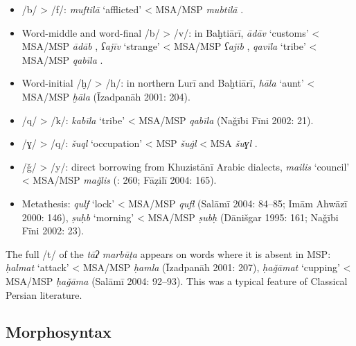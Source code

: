 \documentclass[output=paper]{langsci/langscibook}
\begin{document}
\begin{itemize}
\item
/b/ > /f/: \emph{muftilā} ‘afflicted’ < MSA/MSP \textit{mubtilā} \citep{Borjian2017}.

\item
Word-middle and word-final /b/ > /v/: in Baḫtiārī, \textit{ādāv} ‘customs’ < MSA/MSP \textit{ādāb} \citep[15]{Sarlak2002}, \textit{ʕajīv} ‘strange’ < MSA/MSP \textit{ʕajīb} \citep[25]{Sarlak2002}, \textit{qavīla} ‘tribe’ < MSA/MSP \textit{qabīla} \citep[199]{Sarlak2002}.

\item
Word-initial /ḫ/ > /h/: in northern Lurī and Baḫtiārī, \textit{hāla} ‘aunt’ < MSA/MSP \textit{ḫāla} (Īzadpanāh 2001: 204).

\item
/q/ > /k/: \textit{kabīla} ‘tribe’ < MSA/MSP \textit{qabīla} (Naǧībi Fīni 2002: 21).

\item
/ɣ/ > /q/: \textit{šuql} ‘occupation’ < MSP \textit{šu\.gl} < MSA \textit{šuɣl} \citep{Stilo2001}.

\item
/ǧ/ > /y/: direct borrowing from Khuzistānī Arabic dialects, \textit{mailis} ‘council’ < MSA/MSP \textit{maǧlis} (\citealt{Sarlak2002}: 260; Fāẓilī 2004: 165).

\item
Metathesis: \textit{qulf} ‘lock’ < MSA/MSP \textit{qufl} (Salāmī 2004: 84–85; Imām Ahwāzī 2000: 146), \textit{ṣuḥb} ‘morning’ < MSA/MSP \textit{ṣubḥ} (Dānišgar 1995: 161; Naǧībi Fīni 2002: 23).
\end{itemize}

The full /t/ of the \textit{tāʔ} \textit{marbūṭa} appears on words where it is absent in MSP: \textit{ḥalmat} ‘attack’ < MSA/MSP \textit{ḥamla} (Īzadpanāh 2001: 207), \textit{ḥaǧāmat} ‘cupping’ < MSA/MSP \textit{ḥaǧāma} (Salāmī 2004: 92–93). This was a typical feature of Classical Persian literature.

\subsection{Morphosyntax}
\end{document}
